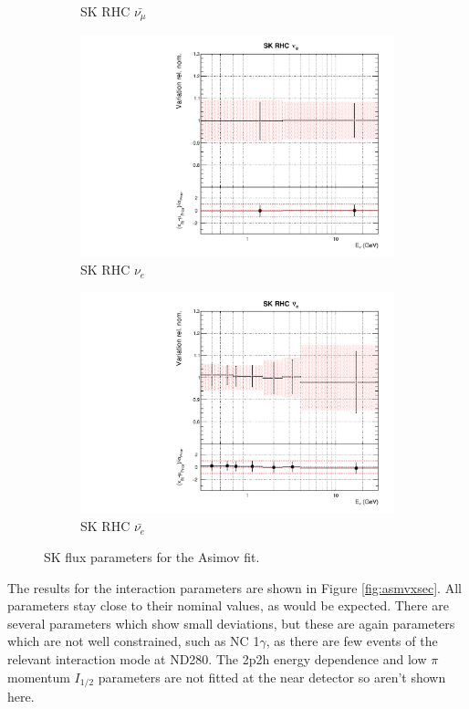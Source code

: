 \begin{figure}
\begin{subfigure}{0.45\textwidth}
  \caption{SK RHC $\bar{\nu_{\mu}}$}
\end{subfigure}
\begin{subfigure}{0.45\textwidth}
  \centering
  \includegraphics[width=0.75\linewidth]{figs/asmvflux14}
  \caption{SK RHC $\nu_{e}$}
\end{subfigure}
\begin{subfigure}{0.45\textwidth}
  \centering
  \includegraphics[width=0.75\linewidth]{figs/asmvflux15}
  \caption{SK RHC $\bar{\nu_e}$}
\end{subfigure}
\caption{SK flux parameters for the Asimov fit.}
\label{fig:asmvfluxSK}
\end{figure}

The results for the interaction parameters are shown in Figure \ref{fig:asmvxsec}. All parameters stay close to their nominal values, as would be expected. There are several parameters which show small deviations, but these are again parameters which are not well constrained, such as NC 1$\gamma$, as there are few events of the relevant interaction mode at ND280. The 2p2h energy dependence and low $\pi$ momentum $I_{1/2}$ parameters are not fitted at the near detector so aren't shown here.

